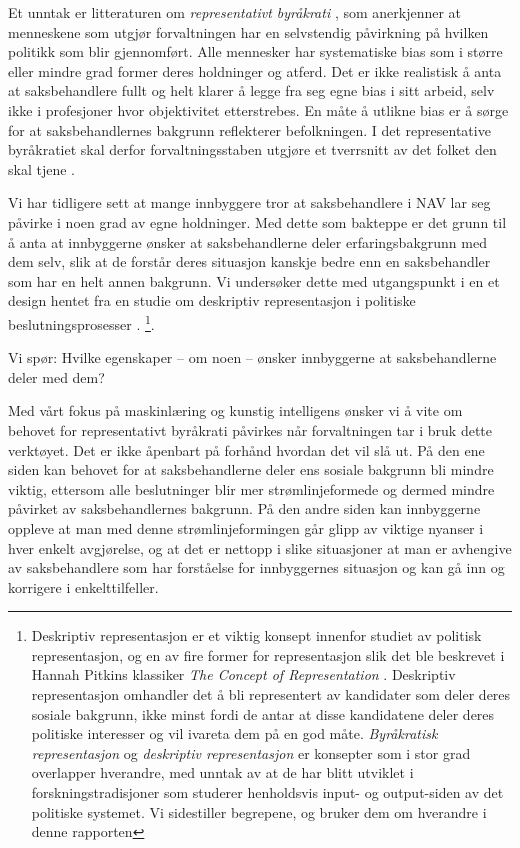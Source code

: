 \documentclass[
]{book}
\begin{document}
Et unntak er litteraturen om \emph{representativt byråkrati} \citep{krislov2012representative, lim2006representative}, som anerkjenner at menneskene som utgjør forvaltningen har en selvstendig påvirkning på hvilken politikk som blir gjennomført.
Alle mennesker har systematiske bias som i større eller mindre grad former deres holdninger og atferd.
Det er ikke realistisk å anta at saksbehandlere fullt og helt klarer å legge fra seg egne bias i sitt arbeid, selv ikke i profesjoner hvor objektivitet etterstrebes.
En måte å utlikne bias er å sørge for at saksbehandlernes bakgrunn reflekterer befolkningen.
I det representative byråkratiet skal derfor forvaltningsstaben utgjøre et tverrsnitt av det folket den skal tjene \citep{laegreid1978byraakrati, christensen2001profesjoner}.

Vi har tidligere sett at mange innbyggere tror at saksbehandlere i NAV lar seg påvirke i noen grad av egne holdninger.
Med dette som bakteppe er det grunn til å anta at innbyggerne ønsker at saksbehandlerne deler erfaringsbakgrunn med dem selv, slik at de forstår deres situasjon kanskje bedre enn en saksbehandler som har en helt annen bakgrunn.
Vi undersøker dette med utgangspunkt i en et design hentet fra en studie om deskriptiv representasjon i politiske beslutningsprosesser \citep{arnesen2018legitimacy}. \footnote{Deskriptiv representasjon er et viktig konsept innenfor studiet av politisk representasjon, og en av fire former for representasjon slik det ble beskrevet i Hannah Pitkins klassiker \emph{The Concept of Representation} \citeyearpar{pitkin1967concept}.
  Deskriptiv representasjon omhandler det å bli representert av kandidater som deler deres sosiale bakgrunn, ikke minst fordi de antar at disse kandidatene deler deres politiske interesser og vil ivareta dem på en god måte.
  \emph{Byråkratisk representasjon} og \emph{deskriptiv representasjon} er konsepter som i stor grad overlapper hverandre, med unntak av at de har blitt utviklet i forskningstradisjoner som studerer henholdsvis input- og output-siden av det politiske systemet.
  Vi sidestiller begrepene, og bruker dem om hverandre i denne rapporten}.

Vi spør:
Hvilke egenskaper -- om noen -- ønsker innbyggerne at saksbehandlerne deler med dem?

Med vårt fokus på maskinlæring og kunstig intelligens ønsker vi å vite om behovet for representativt byråkrati påvirkes når forvaltningen tar i bruk dette verktøyet.
Det er ikke åpenbart på forhånd hvordan det vil slå ut.
På den ene siden kan behovet for at saksbehandlerne deler ens sosiale bakgrunn bli mindre viktig, ettersom alle beslutninger blir mer strømlinjeformede og dermed mindre påvirket av saksbehandlernes bakgrunn.
På den andre siden kan innbyggerne oppleve at man med denne strømlinjeformingen går glipp av viktige nyanser i hver enkelt avgjørelse, og at det er nettopp i slike situasjoner at man er avhengive av saksbehandlere som har forståelse for innbyggernes situasjon og kan gå inn og korrigere i enkelttilfeller.
\end{document}
